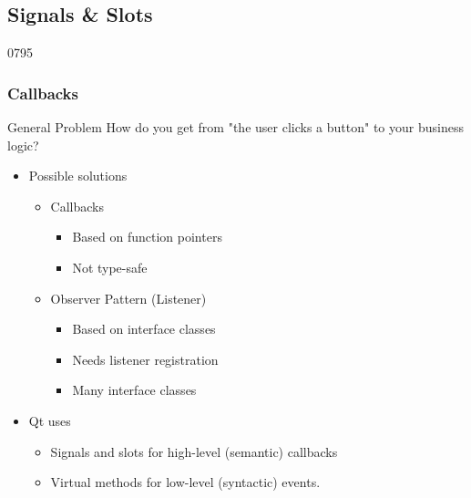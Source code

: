 %
%
%
%

\subsection{Signals \& Slots}

\begin{slide}[fragile]{0795}\frametitle{Callbacks}
  \begin{block}{General Problem}
    How do you get from "the user clicks a button" to your business logic?
  \end{block}
  \begin{itemize}
 \item Possible solutions
    \begin{itemize}
    \item Callbacks
      \begin{itemize}
      \item Based on function pointers
      \item Not type-safe
     \end{itemize}
    \item Observer Pattern (Listener)
      \begin{itemize}
      \item Based on interface classes
      \item Needs listener registration
      \item Many interface classes
      \end{itemize}
    \end{itemize}
  \item Qt uses
    \begin{itemize}
    \item Signals and slots for high-level (semantic) callbacks
    \item Virtual methods for low-level (syntactic) events.
    \end{itemize}
  \end{itemize}
\end{slide}

